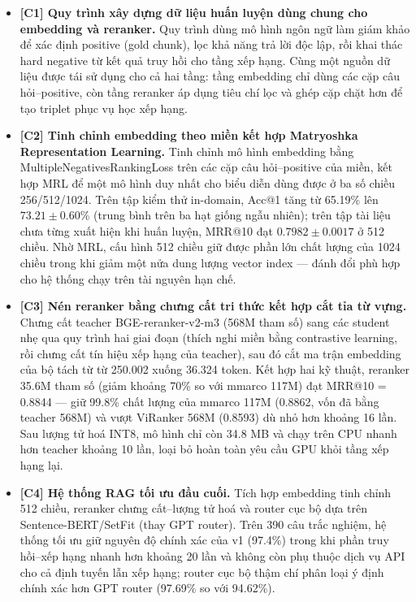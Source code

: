 \documentclass[../DoAn.tex]{subfiles}
\begin{document}
\begin{itemize}
    \item \textbf{[C1] Quy trình xây dựng dữ liệu huấn luyện dùng chung cho embedding và reranker.} Quy trình dùng mô hình ngôn ngữ làm giám khảo để xác định positive (gold chunk), lọc khả năng trả lời độc lập, rồi khai thác hard negative từ kết quả truy hồi cho tầng xếp hạng. Cùng một nguồn dữ liệu được tái sử dụng cho cả hai tầng: tầng embedding chỉ dùng các cặp câu hỏi--positive, còn tầng reranker áp dụng tiêu chí lọc và ghép cặp chặt hơn để tạo triplet phục vụ học xếp hạng.

    \item \textbf{[C2] Tinh chỉnh embedding theo miền kết hợp Matryoshka Representation Learning.} Tinh chỉnh mô hình embedding bằng MultipleNegativesRankingLoss trên các cặp câu hỏi--positive của miền, kết hợp MRL để một mô hình duy nhất cho biểu diễn dùng được ở ba số chiều 256/512/1024. Trên tập kiểm thử in-domain, Acc@1 tăng từ 65.19\% lên $73.21 \pm 0.60$\% (trung bình trên ba hạt giống ngẫu nhiên); trên tập tài liệu chưa từng xuất hiện khi huấn luyện, MRR@10 đạt $0.7982 \pm 0.0017$ ở 512 chiều. Nhờ MRL, cấu hình 512 chiều giữ được phần lớn chất lượng của 1024 chiều trong khi giảm một nửa dung lượng vector index --- đánh đổi phù hợp cho hệ thống chạy trên tài nguyên hạn chế.

    \item \textbf{[C3] Nén reranker bằng chưng cất tri thức kết hợp cắt tỉa từ vựng.} Chưng cất teacher BGE-reranker-v2-m3 (568M tham số) sang các student nhẹ qua quy trình hai giai đoạn (thích nghi miền bằng contrastive learning, rồi chưng cất tín hiệu xếp hạng của teacher), sau đó cắt ma trận embedding của bộ tách từ từ 250.002 xuống 36.324 token. Kết hợp hai kỹ thuật, reranker 35.6M tham số (giảm khoảng 70\% so với mmarco 117M) đạt MRR@10 = 0.8844 --- giữ 99.8\% chất lượng của mmarco 117M (0.8862, vốn đã bằng teacher 568M) và vượt ViRanker 568M (0.8593) dù nhỏ hơn khoảng 16 lần. Sau lượng tử hoá INT8, mô hình chỉ còn 34.8 MB và chạy trên CPU nhanh hơn teacher khoảng 10 lần, loại bỏ hoàn toàn yêu cầu GPU khỏi tầng xếp hạng lại.

    \item \textbf{[C4] Hệ thống RAG tối ưu đầu cuối.} Tích hợp embedding tinh chỉnh 512 chiều, reranker chưng cất--lượng tử hoá và router cục bộ dựa trên Sentence-BERT/SetFit (thay GPT router). Trên 390 câu trắc nghiệm, hệ thống tối ưu giữ nguyên độ chính xác của v1 (97.4\%) trong khi phần truy hồi--xếp hạng nhanh hơn khoảng 20 lần và không còn phụ thuộc dịch vụ API cho cả định tuyến lẫn xếp hạng; router cục bộ thậm chí phân loại ý định chính xác hơn GPT router (97.69\% so với 94.62\%).
\end{itemize}
\end{document}
